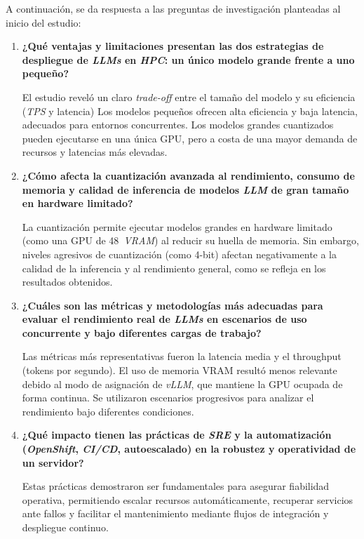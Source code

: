 A continuación, se da respuesta a las preguntas de investigación planteadas al inicio del estudio:

\begin{enumerate}
    \item \textbf{¿Qué ventajas y limitaciones presentan las dos estrategias de despliegue de \textit{LLMs} en \textit{HPC}: un único modelo grande frente a uno pequeño?}
    
    El estudio reveló un claro \textit{trade-off} entre el tamaño del modelo y su eficiencia (\textit{TPS} y latencia) Los modelos pequeños ofrecen alta eficiencia y baja latencia, adecuados para entornos concurrentes. Los modelos grandes cuantizados pueden ejecutarse en una única GPU, pero a costa de una mayor demanda de recursos y latencias más elevadas.

    \item \textbf{¿Cómo afecta la cuantización avanzada al rendimiento, consumo de memoria y calidad de inferencia de modelos \textit{LLM} de gran tamaño en hardware limitado?}
    
    La cuantización permite ejecutar modelos grandes en hardware limitado (como una GPU de 48~\textit{VRAM}) al reducir su huella de memoria. Sin embargo, niveles agresivos de cuantización (como 4-bit) afectan negativamente a la calidad de la inferencia y al rendimiento general, como se refleja en los resultados obtenidos.

    \item \textbf{¿Cuáles son las métricas y metodologías más adecuadas para evaluar el rendimiento real de \textit{LLMs} en escenarios de uso concurrente y bajo diferentes cargas de trabajo?}
    
    Las métricas más representativas fueron la latencia media y el throughput (tokens por segundo). El uso de memoria VRAM resultó menos relevante debido al modo de asignación de \textit{vLLM}, que mantiene la GPU ocupada de forma continua. Se utilizaron escenarios progresivos para analizar el rendimiento bajo diferentes condiciones.

    \item \textbf{¿Qué impacto tienen las prácticas de \textit{SRE} y la automatización (\textit{OpenShift}, \textit{CI/CD}, autoescalado) en la robustez y operatividad de un servidor?}
    
    Estas prácticas demostraron ser fundamentales para asegurar fiabilidad operativa, permitiendo escalar recursos automáticamente, recuperar servicios ante fallos y facilitar el mantenimiento mediante flujos de integración y despliegue continuo.
    

\end{enumerate}
